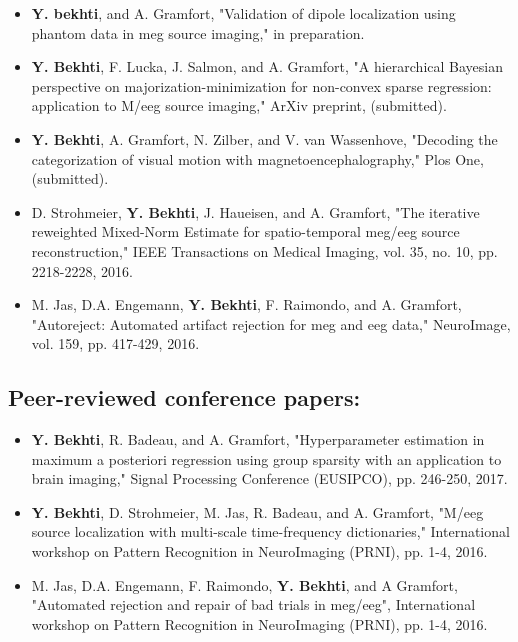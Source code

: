 \begin{itemize}
\item \textbf{Y. bekhti}, and A. Gramfort, "Validation of dipole localization using phantom data in \ac{meg} source imaging," in preparation.
\item \textbf{Y. Bekhti}, F. Lucka, J. Salmon, and A. Gramfort, "A hierarchical Bayesian perspective on majorization-minimization for non-convex sparse regression: application to M/\ac{eeg} source imaging," ArXiv preprint, (submitted).
\item \textbf{Y. Bekhti}, A. Gramfort, N. Zilber, and V. van Wassenhove, "Decoding the categorization of visual motion with magnetoencephalography," Plos One, (submitted).
\item D. Strohmeier, \textbf{Y. Bekhti}, J. Haueisen, and A. Gramfort, "The iterative reweighted Mixed-Norm Estimate for spatio-temporal \ac{meg}/\ac{eeg} source reconstruction," IEEE Transactions on Medical Imaging, vol. 35, no. 10, pp. 2218-2228, 2016.
\item M. Jas, D.A. Engemann, \textbf{Y. Bekhti}, F. Raimondo, and A. Gramfort, "Autoreject: Automated artifact rejection for \ac{meg} and \ac{eeg} data," NeuroImage, vol. 159, pp. 417-429, 2016.
\end{itemize}

\subsection*{Peer-reviewed conference papers:}
\begin{itemize}
\item \textbf{Y. Bekhti}, R. Badeau, and A. Gramfort, "Hyperparameter estimation in maximum a posteriori regression using group sparsity with an application to brain imaging," Signal Processing Conference (EUSIPCO), pp. 246-250, 2017.
\item \textbf{Y. Bekhti}, D. Strohmeier, M. Jas, R. Badeau, and A. Gramfort, "M/\ac{eeg} source localization with multi-scale time-frequency dictionaries," International workshop on Pattern Recognition in NeuroImaging (PRNI), pp. 1-4, 2016.
\item M. Jas, D.A. Engemann, F. Raimondo, \textbf{Y. Bekhti}, and A Gramfort, "Automated rejection and repair of bad trials in \ac{meg}/\ac{eeg}", International workshop on Pattern Recognition in NeuroImaging (PRNI), pp. 1-4, 2016.
\end{itemize}
